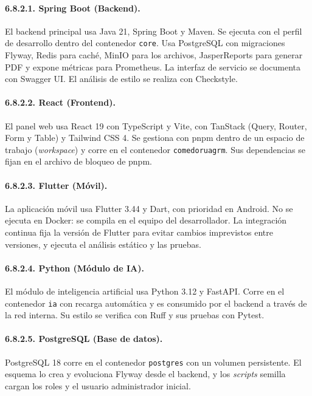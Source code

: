 \paragraph{6.8.2.1. Spring Boot (Backend).}

El backend principal usa Java 21, Spring Boot y Maven. Se ejecuta con el perfil de desarrollo dentro del contenedor \texttt{core}. Usa PostgreSQL con migraciones Flyway, Redis para caché, MinIO para los archivos, JasperReports para generar PDF y expone métricas para Prometheus. La interfaz de servicio se documenta con Swagger UI. El análisis de estilo se realiza con Checkstyle.

\paragraph{6.8.2.2. React (Frontend).}

El panel web usa React 19 con TypeScript y Vite, con TanStack (Query, Router, Form y Table) y Tailwind CSS 4. Se gestiona con pnpm dentro de un espacio de trabajo (\textit{workspace}) y corre en el contenedor \texttt{comedoruagrm}. Sus dependencias se fijan en el archivo de bloqueo de pnpm.

\paragraph{6.8.2.3. Flutter (Móvil).}

La aplicación móvil usa Flutter 3.44 y Dart, con prioridad en Android. No se ejecuta en Docker: se compila en el equipo del desarrollador. La integración continua fija la versión de Flutter para evitar cambios imprevistos entre versiones, y ejecuta el análisis estático y las pruebas.

\paragraph{6.8.2.4. Python (Módulo de IA).}

El módulo de inteligencia artificial usa Python 3.12 y FastAPI. Corre en el contenedor \texttt{ia} con recarga automática y es consumido por el backend a través de la red interna. Su estilo se verifica con Ruff y sus pruebas con Pytest.

\paragraph{6.8.2.5. PostgreSQL (Base de datos).}

PostgreSQL 18 corre en el contenedor \texttt{postgres} con un volumen persistente. El esquema lo crea y evoluciona Flyway desde el backend, y los \textit{scripts} semilla cargan los roles y el usuario administrador inicial.

